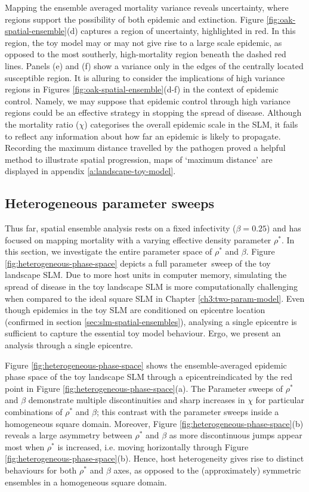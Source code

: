 Mapping the ensemble averaged mortality variance reveals uncertainty, where regions support the possibility of both epidemic and extinction.
Figure \ref{fig:oak-spatial-ensemble}(d) captures a region of uncertainty, highlighted in red.
In this region, the toy model may or may not give rise to a large scale epidemic, as opposed to the most southerly, 
high-mortality region beneath the dashed red lines. Panels (e) and (f) show a variance only in the edges of the centrally
located susceptible region. It is alluring to consider the implications of high variance regions in Figures \ref{fig:oak-spatial-ensemble}(d-f)
in the context of epidemic control. Namely, we may suppose that epidemic control through high variance regions could be an effective strategy
in stopping the spread of disease.
Although the mortality ratio ($\chi$) categorises the overall epidemic scale in the SLM, 
it fails to reflect any information about how far an epidemic is likely to propagate.
Recording the maximum distance travelled by the pathogen proved a helpful method to illustrate spatial progression,
maps of `maximum distance' are displayed in appendix \ref{a:landscape-toy-model}. 


\subsection{Heterogeneous parameter sweeps}

Thus far, spatial ensemble analysis rests on a fixed infectivity ($\beta=0.25$)
and has focused on mapping mortality with a varying effective density parameter $\rho^*$.
In this section, we investigate the entire parameter space of $\rho^*$ and $\beta$.
Figure \ref{fig:heterogeneous-phase-space} depicts a full parameter sweep of the toy landscape SLM.
Due to more host units in computer memory, simulating the spread of disease in the toy landscape SLM is more 
computationally challenging when compared to the ideal square SLM in Chapter \ref{ch3:two-param-model}.
Even though epidemics in the toy SLM are conditioned on epicentre location (confirmed in section \ref{sec:slm-spatial-ensembles}),
analysing a single epicentre is sufficient to capture the essential toy model behaviour.
Ergo, we present an analysis through a single epicentre.

Figure \ref{fig:heterogeneous-phase-space} shows the ensemble-averaged epidemic phase space of the toy landscape SLM
through a epicentre\textemdash indicated by the red point in Figure \ref{fig:heterogeneous-phase-space}(a).
The Parameter sweeps of $\rho^{*}$ and $\beta$ demonstrate multiple discontinuities and sharp increases in $\chi$
for particular combinations of $\rho^{*}$ and $\beta$; this contrast with the parameter sweeps inside a homogeneous square domain.
Moreover, Figure \ref{fig:heterogeneous-phase-space}(b) reveals a large asymmetry between $\rho^*$ and $\beta$ 
as more discontinuous jumps appear most when $\rho^*$ is increased, i.e. moving horizontally 
through Figure \ref{fig:heterogeneous-phase-space}(b). Hence, host heterogeneity gives rise to distinct behaviours for both
$\rho^*$ and $\beta$ axes, as opposed to the (approximately) symmetric ensembles in a homogeneous square domain.  

